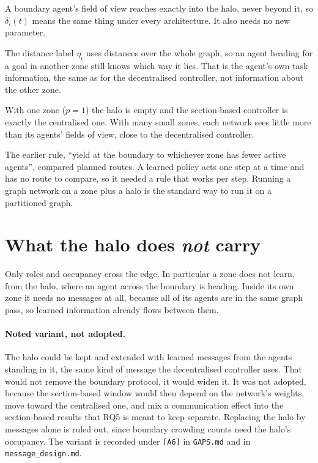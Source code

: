 \documentclass[11pt,a4paper]{article}
\begin{document}
\begin{description}[leftmargin=*]
  \item[Depth equals $d_{\mathrm{obs}}$.] A boundary agent's field of view
        reaches exactly into the halo, never beyond it, so $\delta_i(t)$
        means the same thing under every architecture. It also needs no new
        parameter.
  \item[Direction still works across zones.] The distance label $\eta_i$
        uses distances over the whole graph, so an agent heading for a goal
        in another zone still knows which way it lies. That is the agent's
        own task information, the same as for the decentralised controller,
        not information about the other zone.
  \item[A continuum of windows.] With one zone ($p = 1$) the halo is empty
        and the section-based controller is exactly the centralised one.
        With many small zones, each network sees little more than its
        agents' fields of view, close to the decentralised controller.
  \item[It replaced a planning rule.] The earlier rule, ``yield at the
        boundary to whichever zone has fewer active agents'', compared
        planned routes. A learned policy acts one step at a time and has no
        route to compare, so it needed a rule that works per step. Running a
        graph network on a zone plus a halo is the standard way to run it
        on a partitioned graph.
\end{description}

\section{What the halo does \emph{not} carry}

Only roles and occupancy cross the edge. In particular a zone does not
learn, from the halo, where an agent across the boundary is heading. Inside
its own zone it needs no messages at all, because all of its agents are in
the same graph pass, so learned information already flows between them.

\paragraph{Noted variant, not adopted.} The halo could be kept and
extended with learned messages from the agents standing in it, the same
kind of message the decentralised controller uses. That would not remove
the boundary protocol, it would widen it. It was not adopted, because the
section-based window would then depend on the network's weights, move
toward the centralised one, and mix a communication effect into the
section-based results that RQ5 is meant to keep separate. Replacing the
halo by messages alone is ruled out, since boundary crowding counts need
the halo's occupancy. The variant is recorded under \texttt{[A6]} in
\texttt{GAPS.md} and in \texttt{message\_design.md}.
\end{document}
